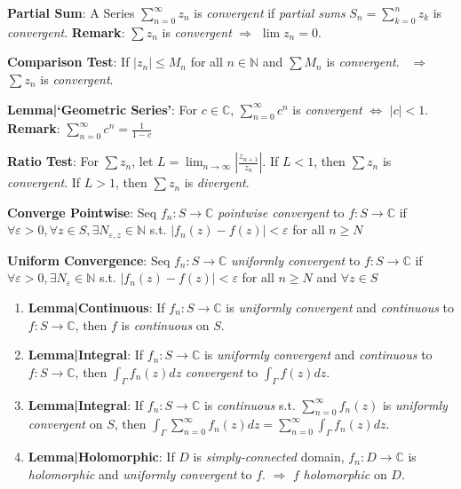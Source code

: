 \documentclass[9pt]{article}
\begin{document}
\textbf{Partial Sum}: A Series $\sum_{n=0}^{\infty}z_n$ is \textit{convergent} if \textit{partial sums} $S_n = \sum_{k=0}^{n}z_k$ is \textit{convergent}. \quad \textbf{Remark}: $\sum z_n$ is \textit{convergent} $\Rightarrow$ $\lim z_n=0$.

\textbf{Comparison Test}: If $|z_n|\leq M_n$ for all $n\in\mathbb{N}$ and $\sum M_n$ is \textit{convergent}. \ $\Rightarrow$ \ $\sum z_n$ is \textit{convergent}.

\textbf{Lemma|`Geometric Series'}: For $c\in\mathbb{C}$, $\sum_{n=0}^\infty c^n$ is \textit{convergent} $\Leftrightarrow$ $|c|<1$. \quad \textbf{Remark}: $\sum_{n=0}^\infty c^n=\frac{1}{1-c}$

\textbf{Ratio Test}: {\small For $\sum z_n$, let $L = \lim_{n\to\infty}\left|\frac{z_{n+1}}{z_n}\right|$. \quad If $L<1$, then $\sum z_n$ is \textit{convergent}. \quad If $L>1$, then $\sum z_n$ is \textit{divergent}.} 

\textbf{Converge Pointwise}: {\small Seq $f_n: S\to\mathbb{C}$ \textit{pointwise convergent} to $f:S\to\mathbb{C}$ if \quad $\forall \varepsilon>0, \forall z \in S, \exists N_{\varepsilon,z}\in\mathbb{N}$ s.t. $|f_n(z)-f(z)|<\varepsilon$ for all $n\geq N$}

\textbf{Uniform Convergence}: {\small Seq $f_n: S\to\mathbb{C}$ \textit{uniformly convergent} to $f:S\to\mathbb{C}$ if \quad $\forall \varepsilon>0, \exists N_{\varepsilon}\in\mathbb{N}$ s.t. $|f_n(z)-f(z)|<\varepsilon$ for all $n\geq N$ and $\forall z\in S$}

\begin{enumerate}[itemsep=-2pt, topsep=-2pt]
    \item \textbf{Lemma|Continuous}: If $f_n:S\to\mathbb{C}$ is \textit{uniformly convergent} and \textit{continuous} to $f:S\to\mathbb{C}$, then $f$ is \textit{continuous} on $S$.
    \item \textbf{Lemma|Integral}: If $f_n:S\to\mathbb{C}$ is \textit{uniformly convergent} and \textit{continuous} to $f:S\to\mathbb{C}$, then $\int_{\Gamma}f_n(z)dz$ \textit{convergent} to $\int_{\Gamma}f(z)dz$.
    \item \textbf{Lemma|Integral}: If $f_n:S\to\mathbb{C}$ is \textit{continuous} s.t. $\sum^\infty_{n=0}f_n(z)$ is \textit{uniformly convergent} on $S$, then $\int_{\Gamma}\sum^\infty_{n=0}f_n(z)dz=\sum^\infty_{n=0}\int_{\Gamma}f_n(z)dz$.
    \item \textbf{Lemma|Holomorphic}: {\small If $D$ is \textit{simply-connected} domain, $f_n:D\to\mathbb{C}$ is \textit{holomorphic} and \textit{uniformly convergent} to $f$. $\Rightarrow$ $f$ \textit{holomorphic} on $D$.}
\end{enumerate}
\end{document}

